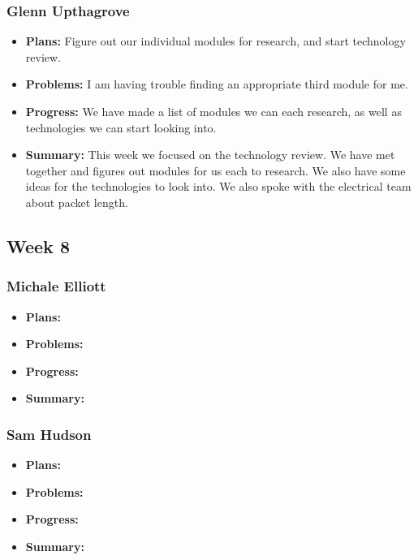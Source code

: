 \documentclass[onecolumn, draftclsnofoot,10pt, compsoc]{IEEEtran}
\begin{document}
\subsubsection{Glenn Upthagrove}
\begin {itemize}
 \item \textbf{Plans: }Figure out our individual modules for research, and start technology review.
 \item \textbf{Problems: }I am having trouble finding an appropriate third module for me. 
 \item \textbf{Progress: }We have made a list of modules we can each research, as well as technologies we can start looking into. 
 \item \textbf{Summary: }This week we focused on the technology review. We have met together and figures out modules for us each to research. We also have some ideas for the technologies to look into. We also spoke with the electrical team about packet length. 
\end {itemize}
\subsection {Week 8}
\subsubsection{Michale Elliott}
\begin {itemize}
 \item \textbf{Plans: }
 \item \textbf{Problems: }
 \item \textbf{Progress: }
 \item \textbf{Summary: }
\end {itemize}
\subsubsection{Sam Hudson}
\begin {itemize}
 \item \textbf{Plans: }
 \item \textbf{Problems: }
 \item \textbf{Progress: }
 \item \textbf{Summary: }
\end {itemize}
\end{document}

